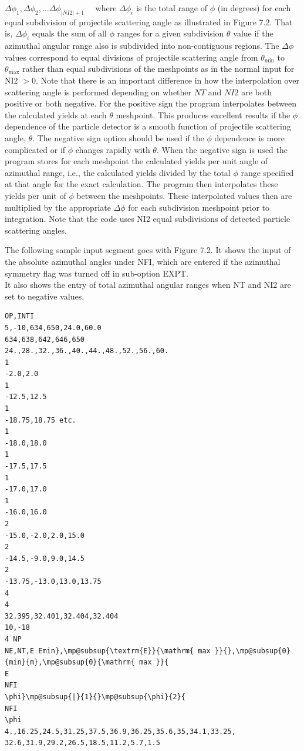 \documentclass[10pt]{article}
\begin{document}
$\Delta \phi_{1}, \Delta \phi_{2}, \ldots \Delta \phi_{|N I 2|+1} \quad$ where $\Delta \phi_{i}$ is the total range of $\phi$ (in degrees) for each equal subdivision of projectile scattering angle as illustrated in Figure 7.2. That is, $\Delta \phi_{i}$ equals the sum of all $\phi$ ranges for a given subdivision $\theta$ value if the azimuthal angular range also is subdivided into non-contiguous regions. The $\Delta \phi$ values correspond to equal divisions of projectile scattering angle from $\theta_{\min }$ to $\theta_{\max }$ rather than equal subdivisions of the meshpoints as in the normal input for NI2 $>0$. Note that there is an important difference in how the interpolation over scattering angle is performed depending on whether $N T$ and $N I 2$ are both positive or both negative. For the positive sign the program interpolates between the calculated yields at each $\theta$ meshpoint. This produces excellent results if the $\phi$ dependence of the particle detector is a smooth function of projectile scattering angle, $\theta$. The negative sign option should be used if the $\phi$ dependence is more complicated or if $\phi$ changes rapidly with $\theta$. When the negative sign is used the program stores for each meshpoint the calculated yields per unit angle of azimuthal range, i.e., the calculated yields divided by the total $\phi$ range specified at that angle for the exact calculation. The program then interpolates these yields per unit of $\phi$ between the meshpoints. These interpolated values then are multiplied by the appropriate $\Delta \phi$ for each subdivision meshpoint prior to integration. Note that the code uses NI2 equal subdivisions of detected particle scattering angles.

The following sample input segment goes with Figure 7.2. It shows the input of the absolute azimuthal angles under NFI, which are entered if the azimuthal symmetry flag was turned off in sub-option EXPT.\\
It also shows the entry of total azimuthal angular ranges when NT and NI2 are set to negative values.

\begin{verbatim}
OP,INTI
5,-10,634,650,24.0,60.0
634,638,642,646,650
24.,28.,32.,36.,40.,44.,48.,52.,56.,60.
1
-2.0,2.0
1
-12.5,12.5
1
-18.75,18.75 etc.
1
-18.0,18.0
1
-17.5,17.5
1
-17.0,17.0
1
-16.0,16.0
2
-15.0,-2.0,2.0,15.0
2
-14.5,-9.0,9.0,14.5
2
-13.75,-13.0,13.0,13.75
4
4
32.395,32.401,32.404,32.404
10,-18
4 NP
NE,NT,E Emin},\mp@subsup{\textrm{E}}{\mathrm{ max }}{},\mp@subsup{0}{min}{m},\mp@subsup{0}{\mathrm{ max }}{
E
NFI
\phi}\mp@subsup{|}{1}{}\mp@subsup{\phi}{2}{
NFI
\phi
4.,16.25,24.5,31.25,37.5,36.9,36.25,35.6,35,34.1,33.25,
32.6,31.9,29.2,26.5,18.5,11.2,5.7,1.5
\end{verbatim}
\end{document}
